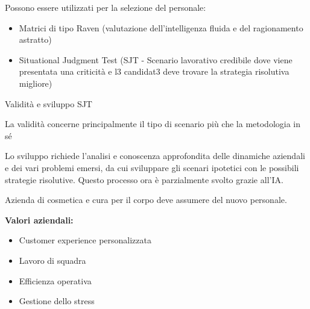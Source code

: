 \documentclass[compress]{beamer}
\begin{document}
\begin{frame}
Possono essere utilizzati per la selezione del personale: 

\begin{itemize}
	\item Matrici di tipo Raven (valutazione dell'intelligenza fluida e del ragionamento astratto) 
	\item Situational Judgment Test (SJT - Scenario lavorativo credibile dove viene presentata una criticità e l3 candidat3 deve trovare la strategia risolutiva migliore)
\end{itemize}

\begin{block}{Validità e sviluppo SJT}
	
	La validità concerne principalmente il tipo di scenario più che la metodologia in sé
	
	Lo sviluppo richiede l'analisi e conoscenza approfondita delle dinamiche aziendali e dei vari problemi emersi, da cui sviluppare gli scenari ipotetici con le possibili strategie risolutive. Questo processo ora è parzialmente svolto grazie all'IA.
\end{block}
\end{frame}

\begin{frame}
Azienda di cosmetica e cura per il corpo deve assumere del nuovo personale.
	
	
	\textbf{Valori aziendali:}
	\begin{itemize}
		\item Customer experience personalizzata
		\item Lavoro di squadra
		\item Efficienza operativa
		\item Gestione dello stress
	\end{itemize}


\end{frame}
\end{document}

